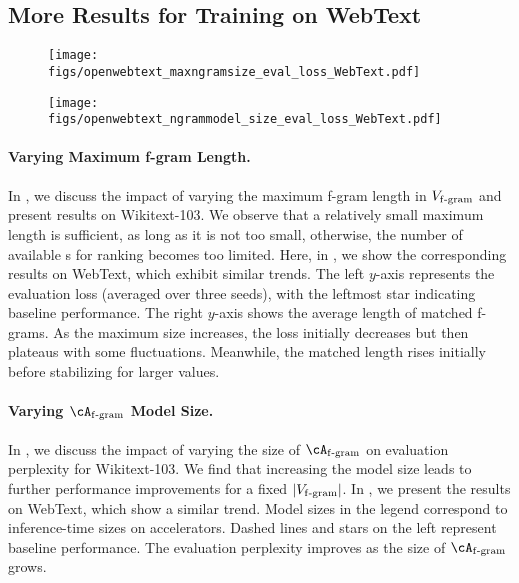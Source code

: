 \subsection{More Results for Training on WebText}
\label{subsec:more_exp_webtext}

\begin{figure}
\centering
\begin{minipage}{.46\textwidth}
  \centering
  \texttt{[image: figs/openwebtext\_maxngramsize\_eval\_loss\_WebText.pdf]}
  \label{fig:scale_max_ngram_size_appendix}
\end{minipage}
\hspace{0.05\textwidth}
\begin{minipage}{.46\textwidth}
  \centering
  \texttt{[image: figs/openwebtext\_ngrammodel\_size\_eval\_loss\_WebText.pdf]}
  \label{fig:scale_ngram_model_appendix}
\end{minipage}
\end{figure}


\paragraph{\boldmath Varying Maximum f-gram Length.}  In , we discuss the impact of varying the maximum f-gram length in $V_{\mathrm{f\text{-}gram}}$ and present results on Wikitext-103. We observe that a relatively small maximum length is sufficient, as long as it is not too small, otherwise, the number of available s for ranking becomes too limited. Here, in , we show the corresponding results on WebText, which exhibit similar trends. The left $y$-axis represents the evaluation loss (averaged over three seeds), with the leftmost star indicating baseline performance. The right $y$-axis shows the average length of matched f-grams. As the maximum size increases, the loss initially decreases but then plateaus with some fluctuations. Meanwhile, the matched length rises initially before stabilizing for larger values. 



\paragraph{\boldmath Varying $\Afgram$ Model Size.} In , we discuss the impact of varying the size of $\Afgram$ on evaluation perplexity for Wikitext-103. We find that increasing the model size leads to further performance improvements for a fixed $|V_{\mathrm{f\text{-}gram}}|$. In , we present the results on WebText, which show a similar trend. Model sizes in the legend correspond to inference-time sizes on accelerators. Dashed lines and stars on the left represent baseline performance.  The evaluation perplexity improves as the size of $\Afgram$ grows.





